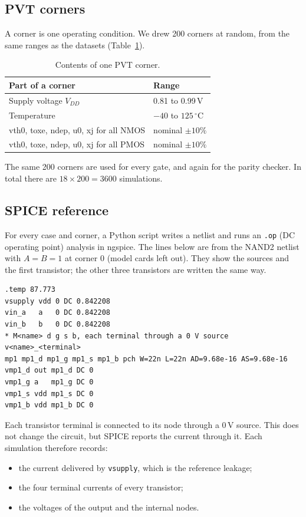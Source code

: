 \documentclass[11pt]{article}
\begin{document}
\subsection{PVT corners}

A corner is one operating condition. We drew 200 corners at random, from the
same ranges as the datasets (Table~\ref{tab:corner}).

\begin{table}[H]
\centering
\begin{tabular}{ll}
\toprule
Part of a corner & Range \\
\midrule
Supply voltage $V_{DD}$ & 0.81 to 0.99\,V \\
Temperature & $-40$ to $125\,^\circ$C \\
vth0, toxe, ndep, u0, xj for all NMOS & nominal $\pm 10\%$ \\
vth0, toxe, ndep, u0, xj for all PMOS & nominal $\pm 10\%$ \\
\bottomrule
\end{tabular}
\caption{Contents of one PVT corner.}
\label{tab:corner}
\end{table}

The same 200 corners are used for every gate, and again for the parity
checker. In total there are $18 \times 200 = 3600$ simulations.

\subsection{SPICE reference}

For every case and corner, a Python script writes a netlist and runs an
\texttt{.op} (DC operating point) analysis in ngspice. The lines below are
from the NAND2 netlist with $A = B = 1$ at corner 0 (model cards left out).
They show the sources and the first transistor; the other three transistors
are written the same way.

\begin{verbatim}
.temp 87.773
vsupply vdd 0 DC 0.842208
vin_a   a   0 DC 0.842208
vin_b   b   0 DC 0.842208
* M<name> d g s b, each terminal through a 0 V source v<name>_<terminal>
mp1 mp1_d mp1_g mp1_s mp1_b pch W=22n L=22n AD=9.68e-16 AS=9.68e-16
vmp1_d out mp1_d DC 0
vmp1_g a   mp1_g DC 0
vmp1_s vdd mp1_s DC 0
vmp1_b vdd mp1_b DC 0
\end{verbatim}

Each transistor terminal is connected to its node through a 0\,V source.
This does not change the circuit, but SPICE reports the current through it.
Each simulation therefore records:
\begin{itemize}
    \item the current delivered by \texttt{vsupply}, which is the reference
          leakage;
    \item the four terminal currents of every transistor;
    \item the voltages of the output and the internal nodes.
\end{itemize}
\end{document}
